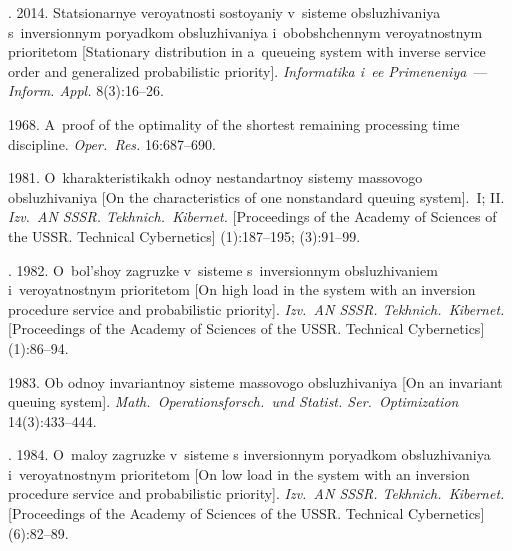   \begin{multicols}{2}

\renewcommand{\bibname}{\protect\rmfamily References}



{\small\frenchspacing
 {%
 \begin{thebibliography}{99}
. 2014.
Sta\-tsi\-o\-nar\-nye veroyatnosti sostoyaniy v~sisteme obsluzhivaniya s~inversionnym poryadkom obsluzhivaniya i~obobshchennym veroyat\-no\-st\-nym
prioritetom [Stationary distribution in a~queueing system with inverse service order and generalized probabilistic priority].
\textit{Informatika i~ee Primeneniya}~---
 \textit{Inform. Appl.}  8(3):16--26.

 1968.
A~proof of the optimality of
the shortest remaining processing time discipline.
\textit{Oper.\ Res.} 16:687--690.



 1981.
O~kharakteristikakh odnoy nestandartnoy sistemy
massovogo obsluzhivaniya
[On the characteristics of one nonstandard queuing
system].~I; II.
\textit{Izv.\ AN SSSR. Tekhnich.\ Kibernet.}
[Proceedings of the Academy of Sciences of
the USSR. Technical Cybernetics] (1):187--195; (3):91--99.

. 1982.
O~bol'shoy zagruzke v~sisteme s~inversionnym
obsluzhivaniem i~ve\-ro\-yat\-no\-st\-nym prioritetom
[On high load in the system with an inversion
procedure service and probabilistic priority].
\textit{Izv.\ AN SSSR. Tekhnich.\ Kibernet.}
[Proceedings of the Academy of Sciences
of the USSR. Technical Cybernetics] (1):86--94.

 1983.
Ob odnoy invariantnoy sisteme massovogo
obsluzhivaniya [On an invariant queuing system].
\textit{Math.\ Operationsforsch.\ und Statist.
Ser.\ Optimization} 14(3):433--444.

. 1984.
O~ma\-loy zagruzke v~sisteme s inversionnym poryadkom
obsluzhivaniya i~veroyatnostnym prioritetom
[On low load in the system with an inversion
procedure service and probabilistic priority].
\textit{Izv.\ AN SSSR. Tekhnich.\ Kibernet.}
[Proceedings of the Academy of Sciences
of the USSR. Technical Cybernetics] (6):82--89.


\end{thebibliography}}}
\end{multicols}
